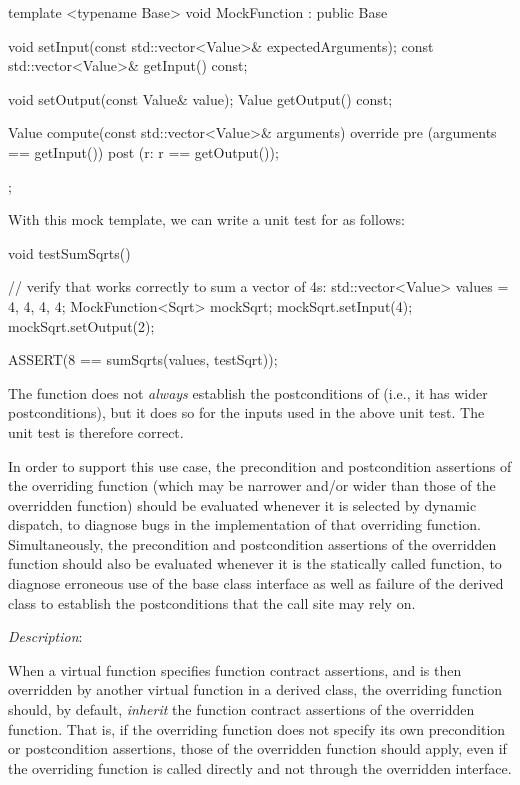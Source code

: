 \begin{codeblock}
template <typename Base>
void MockFunction : public Base {
  void setInput(const std::vector<Value>& expectedArguments);
  const std::vector<Value>& getInput() const;
  
  void setOutput(const Value& value);
  Value getOutput() const;
  
  Value compute(const std::vector<Value>& arguments) override
    pre (arguments == getInput())
    post (r: r == getOutput());
};
\end{codeblock}

With this mock template, we can write a unit test for  as follows:

\begin{codeblock}
void testSumSqrts() {
  // verify that  works correctly to sum a vector of 4s:
  std::vector<Value> values = {4, 4, 4, 4};
  MockFunction<Sqrt> mockSqrt;
  mockSqrt.setInput({4});
  mockSqrt.setOutput({2});
  
  ASSERT(8 == sumSqrts(values, testSqrt));
}
\end{codeblock}

The function  does not \emph{always} establish the postconditions of  (i.e., it has wider postconditions), but it does so for the inputs used in the above unit test. The unit test is therefore correct.

In order to support this use case, the precondition and postcondition assertions of the overriding function  (which may be narrower and/or wider than those of the overridden function) should be evaluated whenever it is selected by dynamic dispatch, to diagnose bugs in the implementation of that overriding function. Simultaneously, the precondition and postcondition assertions of the overridden function should also be evaluated whenever it is the statically called function, to diagnose erroneous use of the base class interface as well as failure of the derived class to establish the postconditions that the call site may rely on. 


\emph{Description}:

When a virtual function specifies function contract assertions, and is then overridden by another virtual function in a derived class, the overriding function should, by default, \emph{inherit} the function contract assertions of the overridden function. That is, if the overriding function does not specify its own precondition or postcondition assertions, those of the overridden function should apply, even if the overriding function is called directly and not through the overridden interface.

